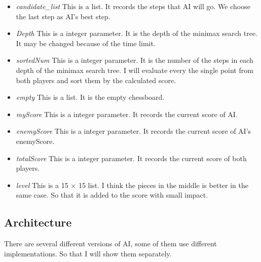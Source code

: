\documentclass[10pt,twocolumn,letterpaper]{article}
\begin{document}
\begin{itemize}
    \item 
    \emph{candidate\_list}
    This is a list. It records the steps that AI will go. We choose the last step as AI's best step. 
\end{itemize}
\begin{itemize}
    \item 
    \emph{Depth}
    This is a integer parameter. It is the depth of the minimax search tree. It may be changed because of the time limit.
\end{itemize}
\begin{itemize}
    \item 
    \emph{sortedNum}
    This is a integer parameter. It is the number of the steps in each depth of the minimax search tree. I will evaluate every the single point from both players and sort them by the calculated score.
\end{itemize}
\begin{itemize}
    \item 
    \emph{empty}
    This is a list. It is the empty chessboard.
\end{itemize}
\begin{itemize}
    \item 
    \emph{myScore}
    This is a integer parameter. It records the current score of AI.
\end{itemize}
\begin{itemize}
    \item 
    \emph{enemyScore}
    This is a integer parameter. It records the current score of AI's enemyScore.
\end{itemize}
\begin{itemize}
    \item 
    \emph{totalScore}
    This is a integer parameter. It records the current score of both players.
\end{itemize}
\begin{itemize}
    \item 
    \emph{level}
    This is a 15 $\times$ 15 list. I think the pieces in the middle is better in the same case. So that it is added to the score with small impact.
\end{itemize}

\subsection{Architecture}
There are several different versions of AI, some of them use different implementations. So that I will show them separately.
\end{document}
